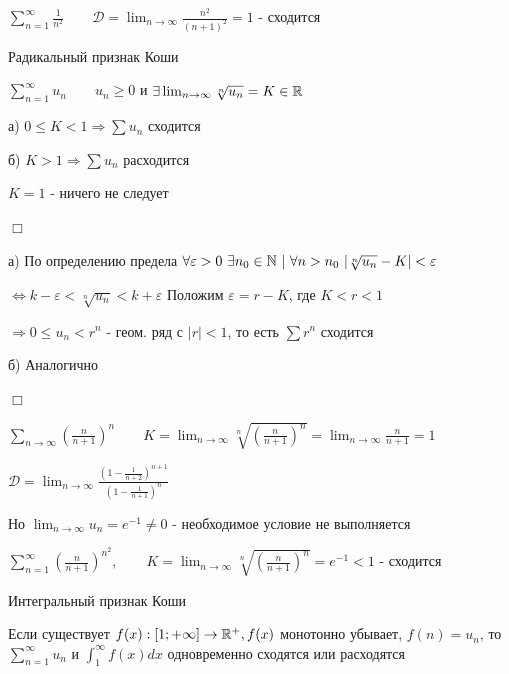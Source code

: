\documentclass[12pt]{article}
\begin{document}
    $\sum_{n = 1}^\infty \frac{1}{n^2} \quad\quad \mathcal{D} = \lim_{n \to \infty} \frac{n^2}{(n + 1)^2} = 1$ - сходится

    \begin{MyTheorem}
         Радикальный признак Коши

        $\sum_{n = 1}^\infty u_n \quad\quad u_n \geq 0$ и $\exists \lim_{n \to \infty} \sqrt[n]{u_n} = K \in \mathbb{R}$

        а) $0 \leq K < 1 \Longrightarrow \sum u_n$ сходится

        б) $K > 1 \Longrightarrow \sum u_n$ расходится
    \end{MyTheorem}

    \Notas $K = 1$ - ничего не следует

    \begin{MyProof}
        $\Box$

        а) По определению предела $\forall \varepsilon > 0 \ \exists n_0 \in \Natural \ | \ \forall n > n_0 \ |\sqrt[n]{u_n} - K| < \varepsilon$

        $\Longleftrightarrow k - \varepsilon < \sqrt[n]{u_n} < k + \varepsilon$ Положим $\varepsilon = r - K$, где $K < r < 1$

        $\Longrightarrow 0 \leq u_n < r^n$ - геом. ряд с $|r| < 1$, то есть $\sum r^n$ сходится

        б) Аналогично

        $\Box$
    \end{MyProof}

     $\sum_{n \to \infty} \left(\frac{n}{n + 1}\right)^n \quad\quad K = \lim_{n \to \infty} \sqrt[n]{\left(\frac{n}{n + 1}\right)^n} = \lim_{n \to \infty} \frac{n}{n + 1} = 1$

    $\mathcal{D} = \lim_{n \to \infty} \frac{\left(1 - \frac{1}{n + 2}\right)^{n + 1}}{\left(1 - \frac{1}{n + 1}\right)^{n}}$

    Но $\lim_{n \to \infty} u_n = e^{-1} \neq 0$ - необходимое условие не выполняется

     $\sum_{n = 1}^\infty \left(\frac{n}{n + 1}\right)^{n^2}, \quad\quad K = \lim_{n \to \infty} \sqrt[n]{\left(\frac{n}{n + 1}\right)^n} = e^{-1} < 1$ - сходится

    \begin{MyTheorem}
         Интегральный признак Коши

        Если существует $f(x) : [1; +\infty] \to \mathbb{R}^+, f(x)$ монотонно убывает, $f(n) = u_n$, то $\sum_{n = 1}^\infty u_n$ и $\int_{1}^\infty f(x) dx$ одновременно сходятся или расходятся
    \end{MyTheorem}
\end{document}
